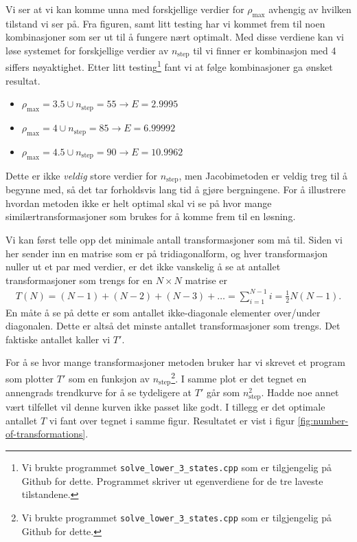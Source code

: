 \documentclass[11pt]{article}
\begin{document}
Vi ser at vi kan komme unna med forskjellige verdier for
$\rho_\text{max}$ avhengig av hvilken tilstand vi ser på. Fra figuren,
samt litt testing har vi kommet frem til noen kombinasjoner som ser
ut til å fungere nært optimalt. Med disse verdiene kan vi løse
systemet for forskjellige verdier av $n_\text{step}$ til vi finner er kombinasjon med 4 siffers
nøyaktighet. Etter litt testing\footnote{Vi brukte programmet
  \texttt{solve\_lower\_3\_states.cpp} som er tilgjengelig på Github for
  dette. Programmet skriver ut egenverdiene for de tre laveste
  tilstandene.} fant vi at følge kombinasjoner ga ønsket resultat. 
\begin{itemize}
  \item[] { $\rho_\text{max} = 3.5 \cup n_\text{step}=55\rightarrow E = 2.9995$}
  \item[] { $\rho_\text{max} = 4   \cup n_\text{step}=85\rightarrow E = 6.99992$}
  \item[] { $\rho_\text{max} = 4.5 \cup n_\text{step}=90\rightarrow E = 10.9962$}
\end{itemize}

Dette er ikke \emph{veldig} store verdier for $n_\text{step}$, men
Jacobimetoden er veldig treg til å begynne med, så det tar forholdsvis
lang tid å gjøre bergningene. For å illustrere hvordan metoden ikke er
helt optimal skal vi se på hvor mange similærtransformasjoner som
brukes for å komme frem til en løsning.

Vi kan først telle opp det minimale antall transformasjoner som må
til. Siden vi her sender inn en matrise som er på tridiagonalform, og
hver transformasjon nuller ut et par med verdier, er det ikke
vanskelig å se at antallet transformasjoner som trengs for en $N\times
N$ matrise er
\begin{align*}
  T(N) = (N-1) + (N-2) + (N-3) + \dots = \sum_{i=1}^{N-1}i = \frac{ 1 }{ 2 }N(N-1).
\end{align*}
En måte å se på dette er som antallet ikke-diagonale elementer
over/under diagonalen. Dette er altså det minste antallet
transformasjoner som trengs. Det faktiske antallet kaller vi $T'$.

For å se hvor mange transformasjoner metoden bruker har vi skrevet et
program som plotter $T'$ som en funksjon av $n_\text{step}$\footnote{Vi brukte programmet
  \texttt{solve\_lower\_3\_states.cpp} som er tilgjengelig på Github for
  dette.}. I samme plot er det tegnet en annengrads trendkurve for å
se tydeligere at $T'$ går som $n_\text{step}^2$. Hadde noe annet
vært tilfellet vil denne kurven ikke passet like godt. I tillegg er
det optimale antallet $T$ vi fant over tegnet i samme figur. Resultatet er vist i
figur \ref{fig:number-of-transformations}. 
\end{document}
